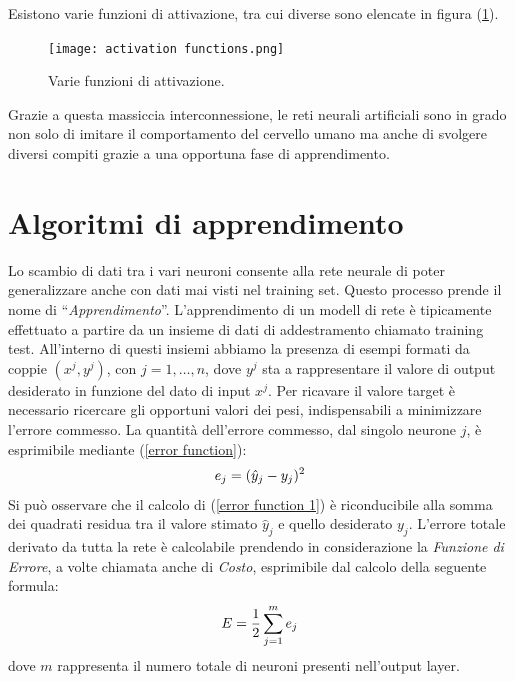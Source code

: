 Esistono varie funzioni di attivazione, tra cui diverse sono elencate 
in figura (\ref{activation functions}).
\begin{figure}
    \centering
    \texttt{[image: activation functions.png]}
    \centering
    \caption{Varie funzioni di attivazione.}
    \label{activation functions}
\end{figure}
Grazie a questa massiccia interconnessione, le reti neurali 
artificiali sono in grado non solo di imitare il comportamento del cervello 
umano ma anche di svolgere diversi compiti grazie a una opportuna fase di 
apprendimento. 

\section{Algoritmi di apprendimento}
Lo scambio di dati tra i vari neuroni consente alla rete neurale di poter 
generalizzare anche con dati mai visti nel training set. Questo processo 
prende il nome di “\emph{Apprendimento}”. L'apprendimento di un modell di rete 
è tipicamente effettuato a partire da un insieme di dati di addestramento 
chiamato training test. All'interno di questi insiemi abbiamo la presenza 
di esempi formati da coppie $(x^j, y^j)$, con $j=1, \dots ,n$, dove $y^j$ sta a rappresentare 
il valore di output desiderato in funzione del dato di input $x^j$. 
Per ricavare il valore target è necessario ricercare gli opportuni valori dei 
pesi, indispensabili a minimizzare l'errore commesso. La quantità dell'errore 
commesso, dal singolo neurone $j$, è esprimibile mediante (\ref{error function}):
\begin{equation}\label{error function 1}
    \emph{$e_j$}=(\hat{y}_j-y_j)^2
\end{equation}
Si può osservare che il calcolo di (\ref{error function 1}) è riconducibile alla somma dei 
quadrati residua tra il valore stimato $\hat{y}_j$ e quello desiderato $y_j$. L'errore 
totale derivato da tutta la rete è calcolabile prendendo in considerazione la 
\emph{Funzione di Errore}, a volte chiamata anche di \emph{Costo}, esprimibile dal calcolo 
della seguente formula:
\begin{equation}\label{error function}
    \emph{$E$}=\frac{1}{2}\sum_{j=1}^me_j
\end{equation}
dove $m$ rappresenta il numero totale di neuroni presenti nell'output layer.
